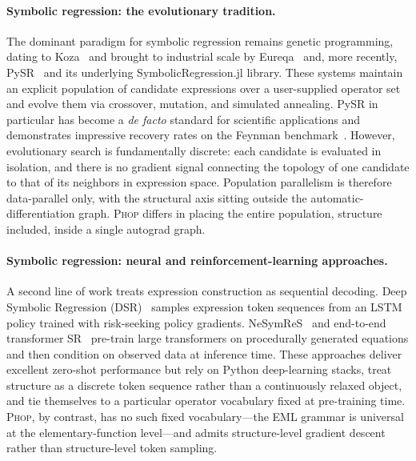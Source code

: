 \documentclass{article}
\begin{document}
\paragraph{Symbolic regression: the evolutionary tradition.}
The dominant paradigm for symbolic regression remains genetic
programming, dating to Koza~\cite{koza1992gp} and brought to industrial
scale by Eureqa~\cite{schmidt2009eureqa} and, more recently,
PySR~\cite{cranmer2023pysr} and its underlying
SymbolicRegression.jl library. These systems maintain an explicit
population of candidate expressions over a user-supplied operator set
and evolve them via crossover, mutation, and simulated annealing.
PySR in particular has become a \emph{de facto} standard for scientific
applications and demonstrates impressive recovery rates on the
Feynman benchmark~\cite{udrescu2020aifeynman}. However, evolutionary
search is fundamentally discrete: each candidate is evaluated in
isolation, and there is no gradient signal connecting the topology of
one candidate to that of its neighbors in expression space. Population
parallelism is therefore data-parallel only, with the structural axis
sitting outside the automatic-differentiation graph.
\textsc{Phop} differs in placing the entire population, structure
included, inside a single autograd graph.

\paragraph{Symbolic regression: neural and reinforcement-learning approaches.}
A second line of work treats expression construction as sequential
decoding. Deep Symbolic Regression
(DSR)~\cite{petersen2021dsr} samples expression token sequences from
an LSTM policy trained with risk-seeking policy
gradients. NeSymReS~\cite{biggio2021nesymres} and end-to-end
transformer SR~\cite{kamienny2022e2e} pre-train large transformers on
procedurally generated equations and then condition on observed data
at inference time. These approaches deliver excellent zero-shot
performance but rely on Python deep-learning stacks, treat structure as
a discrete token sequence rather than a continuously relaxed
object, and tie themselves to a particular operator vocabulary fixed
at pre-training time. \textsc{Phop}, by contrast, has no such fixed
vocabulary—the EML grammar is universal at the elementary-function
level—and admits structure-level gradient descent rather than
structure-level token sampling.
\end{document}
